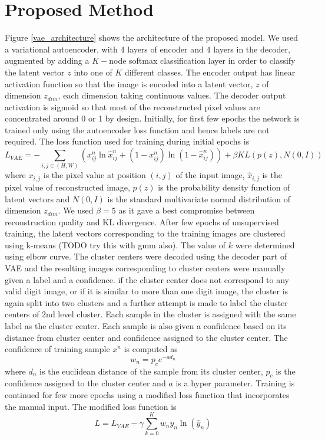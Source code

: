 \documentclass[journal]{IEEEtran}
\begin{document}
\section{Proposed Method}
Figure \ref{vae_architecture} shows the architecture of the proposed model. We used a variational autoencoder, with 4 layers of encoder and 4 layers in the decoder, augmented by adding a $K-$node softmax classification layer in order to classify the latent vector $z$ into one of $K$ different classes.  The encoder output has linear activation function so that the image is encoded into a latent vector, $z$  of dimension $z_{dim}$, each dimension taking continuous values. The decoder output activation is sigmoid so that most of the reconstructed pixel values  are concentrated around 0 or 1 by design. Initially, for first few epochs the network is trained only using the autoencoder loss function and hence labels are not required. The loss function used for training during initial epochs is 
\begin{equation}
L_{VAE} = -\sum_{i, j \in (H, W)}(x_{ij}^n \ln \hat{x}_{ij}^n + (1 - x_{ij}^n) \ln(1 -  \hat{x}_{ij}^n ) )  + \beta KL(p(z), N(0,I))
\end{equation}
where   $x_{i, j}$ is the pixel value at position $(i, j)$ of the input image, $\hat{x}_{i, j}$ is the pixel value of reconstructed image, $p(z)$ is the probability density function of latent vectors and $N(0,I)$ is the standard multivariate normal distribution of dimension $z_{dim}$. We used $\beta = 5$ as it gave a best compromise between reconstruction quality and KL divergence.   After few epochs of unsupervised training, the latent vectors corresponding to the training images are clustered using k-means (TODO try this with gmm also). The value of $k$ were determined using elbow curve. The cluster centers were decoded using the decoder part of VAE and the resulting images corresponding to cluster centers were manually given a label and a confidence. if the cluster center does not correspond to any valid digit image, or if it is similar to more than one digit image, the cluster is again split into two clusters and a further attempt is made to label the cluster centers of 2nd level cluster.  Each sample in the cluster is assigned with the  same label as the cluster center. Each sample is also given a confidence based on its distance from cluster center and confidence assigned to the cluster center. The confidence of  training sample $x^n$ is computed as
\begin{equation}
w_n = p_ce^{-a d_n}
\end{equation}
where $d_n$ is the euclidean distance of the sample from its cluster center, $p_c$  is the confidence assigned to the cluster center and $a$ is a hyper parameter.
Training is continued for few more epochs using a modified loss function that incorporates the manual input. The modified loss function is
\begin{equation}
L = L_{VAE}  - \gamma \sum_{k=0}^{K}w_{n}y_{n}\ln(\hat{y}_{n})
\end{equation}
\end{document}
